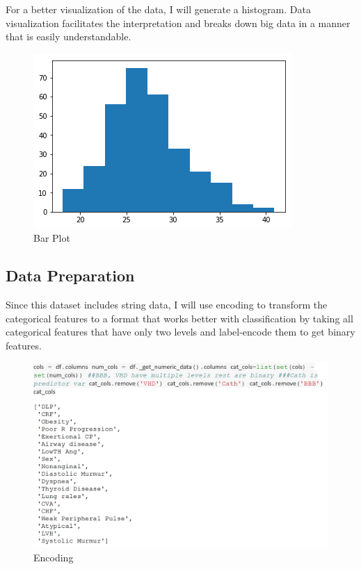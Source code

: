 For a better visualization of the data, I will generate a histogram.
Data visualization facilitates the interpretation and breaks down big
data in a manner that is easily understandable. 

\begin{figure}
    \centering
    \includegraphics[width=1.0\columnwidth]{images/output_2_0.png}
    \caption{Bar Plot}\label{Plot}
\end{figure}



\subsection{Data Preparation}

Since this dataset includes string data, I will use encoding to
transform the categorical features to a format that works better with
classification by taking all categorical features that have only two
levels and label-encode them to get binary features.

\begin{figure}
    \centering
    \includegraphics[width=1.0\columnwidth]{images/Untitled3.png}
    \caption{Encoding}\label{Encoding}
\end{figure}

